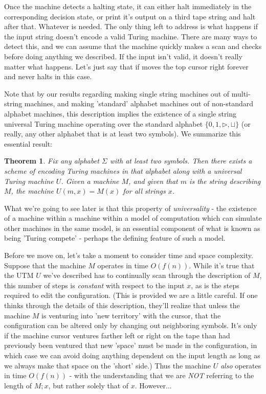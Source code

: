 \documentclass{article}
\theoremstyle{definition}
\theoremstyle{plain}
\theoremstyle{theorem}
\newtheorem{theorem}{Theorem}[section]
\begin{document}
Once the machine detects a halting state, it can either halt immediately in the corresponding decision state, or print it's output on a third tape string and halt after that. Whatever is needed. The only thing left to address is what happens if the input string doesn't encode a valid Turing machine. There are many ways to detect this, and we can assume that the machine quickly makes a scan and checks before doing anything we described. If the input isn't valid, it doesn't really matter what happens. Let's just say that if moves the top cursor right forever and never halts in this case. \par
Note that by our results regarding making single string machines out of multi-string machines, and making 'standard' alphabet machines out of non-standard alphabet machines, this description implies the existence of a single string universal Turing machine operating over the standard alphabet $\{0,1,\triangleright,\sqcup\}$ (or really, any other alphabet that is at least two symbols). We summarize this essential result:
\begin{theorem}
	Fix any alphabet $\Sigma$ with at least two symbols. Then there exists a scheme of encoding Turing machines in that alphabet along with a universal Turing machine $U$. Given a machine $M$, and given that $m$ is the string describing $M$, the machine $U(m,x) = M(x)$ for all strings $x$. 
\end{theorem}
What we're going to see later is that this property of \textit{universality} - the existence of a machine within a machine within a model of computation which can simulate other machines in the same model, is an essential component of what is known as being 'Turing compete' - perhaps the defining feature of such a model. \par 
Before we move on, let's take a moment to consider time and space complexity. Suppose that the machine $M$ operates in time $O(f(n))$. While it's true that the UTM $U$ we've described has to continually scan through the description of $M$, this number of steps is \textit{constant} with respect to the input $x$, as is the steps required to edit the configuration. (This is provided we are a little careful. If one thinks through the details of this description, they'll realize that unless the machine $M$ is venturing into 'new territory' with the cursor, that the configuration can be altered only by changing out neighboring symbols. It's only if the machine cursor ventures farther left or right on the tape than had previously been ventured that new 'space' must be made in the configuration, in which case we can avoid doing anything dependent on the input length as long as we always make that space on the 'short' side.) Thus the machine $U$ \textit{also} operates in time $O(f(n))$ - with the understanding that we are \textit{NOT} referring to the length of $M;x$, but rather solely that of $x$. However...
\end{document}
